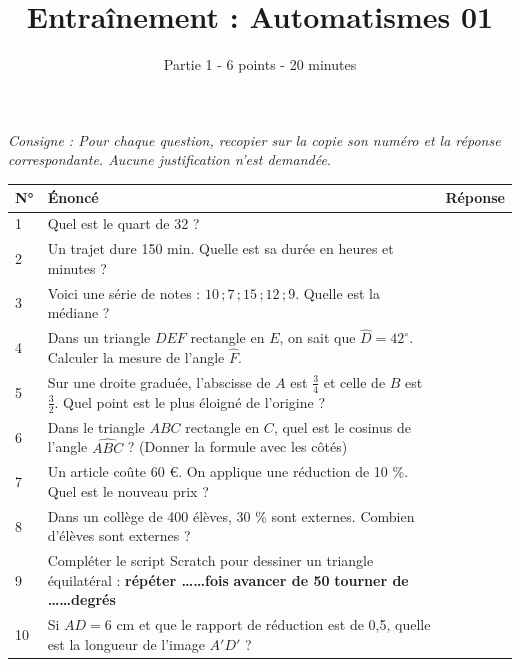 \documentclass[10pt,a4paper]{article}
\title{Entraînement : Automatismes 01}
\author{Partie 1 - 6 points - 20 minutes}
\begin{document}
\maketitle

\textit{Consigne : Pour chaque question, recopier sur la copie son numéro et la réponse correspondante. Aucune justification n'est demandée.} 

\begin{center}
\renewcommand{\arraystretch}{2.5}
\begin{tabular}{|p{}|p{}|p{}|}
\hline
\textbf{N°} & \textbf{Énoncé} & \textbf{Réponse} \\ \hline
1 & Quel est le quart de 32 ? &  \\ \hline
2 & Un trajet dure 150 min. Quelle est sa durée en heures et minutes ? &  \\ \hline
3 & Voici une série de notes : $10 \, ; 7 \, ; 15 \, ; 12 \, ; 9$. Quelle est la médiane ? &  \\ \hline
4 & Dans un triangle $DEF$ rectangle en $E$, on sait que $\widehat{D} = 42^\circ$. Calculer la mesure de l'angle $\widehat{F}$. &  \\ \hline
5 & Sur une droite graduée, l'abscisse de $A$ est $\frac{3}{4}$ et celle de $B$ est $\frac{3}{2}$. Quel point est le plus éloigné de l'origine ? &  \\ \hline
6 & Dans le triangle $ABC$ rectangle en $C$, quel est le cosinus de l'angle $\widehat{ABC}$ ? (Donner la formule avec les côtés) &  \\ \hline
7 & Un article coûte 60 €. On applique une réduction de 10 \%. Quel est le nouveau prix ? &  \\ \hline
8 & Dans un collège de 400 élèves, 30 \% sont externes. Combien d'élèves sont externes ? &  \\ \hline
9 & Compléter le script Scratch pour dessiner un triangle équilatéral : \newline \textbf{répéter \dots\dots fois} \newline \textbf{avancer de 50} \newline \textbf{tourner de \dots\dots degrés} &  \\ \hline
10 & Si $AD = 6$ cm et que le rapport de réduction est de 0,5, quelle est la longueur de l'image $A'D'$ ? &  \\ \hline
\end{tabular}
\end{center}

\newpage
\end{document}
